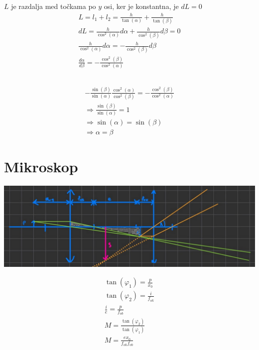 \documentclass[a4paper,12pt]{article}
\begin{document}
\subsection{}
$L$ je razdalja med točkama po $y$ osi, ker je konstantna, je $dL = 0$
\begin{align}
    L = l_1 + l_2 = \frac{h}{\tan(\alpha)} + \frac{h}{\tan(\beta)}             \\
    dL = \frac{h}{\cos^2(\alpha)} d\alpha + \frac{h}{\cos^2(\beta)} d\beta = 0 \\
    \frac{h}{\cos^2(\alpha)} d\alpha = -\frac{h}{\cos^2(\beta)} d\beta         \\
    \frac{d \alpha}{d \beta} = -\frac{\cos^2(\beta)}{\cos^2(\alpha)}
\end{align}

\subsection{}
\begin{align}
    -\frac{\sin(\beta)}{\sin(\alpha)} \frac{\cos^2(\alpha)}{\cos^2(\beta)}= -\frac{\cos^2(\beta)}{\cos^2(\alpha)} \\
    \Rightarrow \frac{\sin(\beta)}{\sin(\alpha)} = 1                                                              \\
    \Rightarrow \sin(\alpha) = \sin(\beta)                                                                        \\
    \Rightarrow \alpha = \beta
\end{align}

\section{Mikroskop}\label{sec:mikroskop}
\includegraphics[width=\textwidth]{mikroskop.png}

\begin{align}
    \tan(\varphi_1) = \frac{p}{x_0}             \\
    \tan(\varphi_2) = \frac{i}{f_{ok}}          \\
    \frac{i}{e} = \frac{p}{f_{ob}}              \\
    M = \frac{\tan(\varphi_2)}{\tan(\varphi_1)} \\
    M = \frac{e x_0}{f_{ok} f_{ob}}
\end{align}
\end{document}
